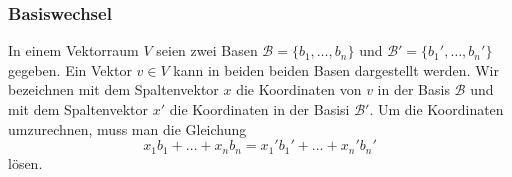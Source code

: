 \subsubsection{Basiswechsel}
In einem Vektorraum $V$ seien zwei Basen $\mathcal{B}=\{b_1,\dots,b_n\}$
und $\mathcal{B}'=\{b_1',\dots,b_n'\}$ gegeben.
Ein Vektor $v\in V$ kann in beiden beiden Basen dargestellt werden.
Wir bezeichnen mit dem Spaltenvektor $x$ die Koordinaten von $v$ in der
Basis $\mathcal{B}$ und mit dem Spaltenvektor $x'$ die Koordinaten
in der Basisi $\mathcal{B}'$.
Um die Koordinaten umzurechnen, muss man die Gleichung
\begin{equation}
x_1b_1 + \dots + x_nb_n = x_1'b_1' + \dots + x_n'b_n'
\label{buch:vektoren-und-matrizen:eqn:basiswechselgleichung}
\end{equation}
lösen.

